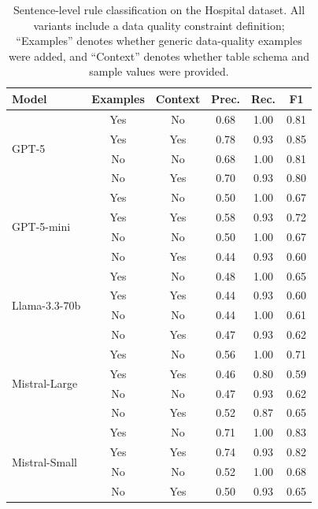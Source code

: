 \begin{table}[htbp]
\centering
\small
\caption{Sentence-level rule classification on the Hospital dataset. All variants include a data quality constraint definition; ``Examples'' denotes whether generic data-quality examples were added, and ``Context'' denotes whether table schema and sample values were provided.}
\label{tab:classification_results_hospital}
\begin{tabular}{@{}lccccc@{}}
\toprule
\textbf{Model} & \textbf{Examples} & \textbf{Context} & \textbf{Prec.} & \textbf{Rec.} & \textbf{F1} \\
\midrule
\multirow{4}{*}{GPT-5} & Yes & No & 0.68 & 1.00 & 0.81 \\
 & Yes & Yes & 0.78 & 0.93 & 0.85 \\
 & No & No & 0.68 & 1.00 & 0.81 \\
 & No & Yes & 0.70 & 0.93 & 0.80 \\
\cmidrule(lr){1-6}
\multirow{4}{*}{GPT-5-mini} & Yes & No & 0.50 & 1.00 & 0.67 \\
 & Yes & Yes & 0.58 & 0.93 & 0.72 \\
 & No & No & 0.50 & 1.00 & 0.67 \\
 & No & Yes & 0.44 & 0.93 & 0.60 \\
\cmidrule(lr){1-6}
\multirow{4}{*}{Llama-3.3-70b} & Yes & No & 0.48 & 1.00 & 0.65 \\
 & Yes & Yes & 0.44 & 0.93 & 0.60 \\
 & No & No & 0.44 & 1.00 & 0.61 \\
 & No & Yes & 0.47 & 0.93 & 0.62 \\
\cmidrule(lr){1-6}
\multirow{4}{*}{Mistral-Large} & Yes & No & 0.56 & 1.00 & 0.71 \\
 & Yes & Yes & 0.46 & 0.80 & 0.59 \\
 & No & No & 0.47 & 0.93 & 0.62 \\
 & No & Yes & 0.52 & 0.87 & 0.65 \\
\cmidrule(lr){1-6}
\multirow{4}{*}{Mistral-Small} & Yes & No & 0.71 & 1.00 & 0.83 \\
 & Yes & Yes & 0.74 & 0.93 & 0.82 \\
 & No & No & 0.52 & 1.00 & 0.68 \\
 & No & Yes & 0.50 & 0.93 & 0.65 \\
\bottomrule
\end{tabular}
\end{table}